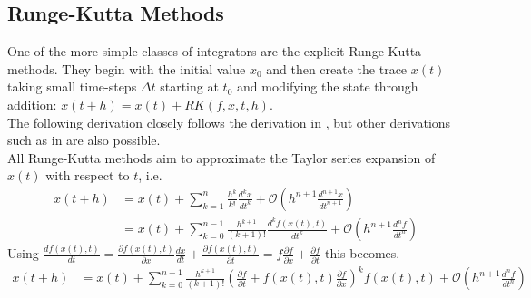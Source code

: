 \subsection{Runge-Kutta Methods}
One of the more simple classes of integrators are the explicit Runge-Kutta methods.
They begin with the initial value $x_0$ and then create the trace $x(t)$ taking small time-steps $\Delta t$ starting at $t_0$ and modifying the state through addition: $x(t+h) = x(t) + RK(f,x,t,h)$.\\
The following derivation closely follows the derivation in \cite{lyu2016plasma}, but other derivations such as in \cite{suli2003introduction} are also possible.\\
All Runge-Kutta methods aim to approximate the Taylor series expansion of $x(t)$ with respect to $t$, i.e.
\begin{align*}
x(t+h) &= x(t) + \sum_{k=1}^{n}\frac{h^k}{k!}\frac{d^kx}{dt^k} + \mathcal{O} \left(h^{n+1}\frac{d^{n+1}x}{dt^{n+1}}\right)\\
&= x(t)+ \sum_{k=0}^{n-1}\frac{h^{k+1}}{(k+1)!}\frac{d^kf(x(t),t)}{dt^k} + \mathcal{O}\left(h^{n+1}\frac{d^{n}f}{dt^{n}}\right)
\end{align*}
Using $\frac{df(x(t),t)}{dt} 
= \frac{\partial f(x(t),t)}{\partial x}\frac{dx}{dt}+\frac{\partial f(x(t),t)}{\partial t} 
= f\frac{\partial f}{\partial x}+\frac{\partial f}{\partial t}$
this becomes.
\begin{align*}
x(t+h) &= x(t)+ \sum_{k=0}^{n-1}\frac{h^{k+1}}{(k+1)!}\left(\frac{\partial f}{\partial t} + f(x(t),t)\frac{\partial f}{\partial x}\right)^kf(x(t),t) + \mathcal{O}\left(h^{n+1}\frac{d^{n}f}{dt^{n}}\right)
\end{align*}


